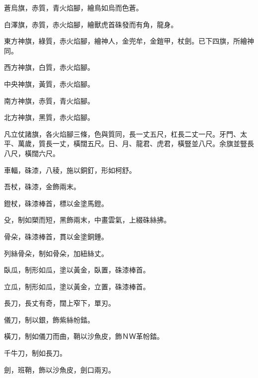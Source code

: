 \begin{pinyinscope}
 蒼烏旗，赤質，青火焰腳，繪鳥如烏而色蒼。



 白澤旗，赤質，赤火焰腳，繪獸虎首硃發而有角，龍身。



 東方神旗，綠質，赤火焰腳，繪神人，金兜牟，金鎧甲，杖劍。已下四旗，所繪神同。



 西方神旗，白質，赤火焰腳。



 中央神旗，黃質，赤火焰腳。



 南方神旗，赤質，青火焰腳。



 北方神旗，黑質，赤火焰腳。



 凡立仗諸旗，各火焰腳三條，色與質同，長一丈五尺，杠長二丈一尺。牙門、太平、萬歲，質長一丈，橫闊五尺。日、月、龍君、虎君，橫豎並八尺。余旗並豎長八尺，橫闊六尺。



 車輻，硃漆，八稜，施以銅釘，形如柯舒。



 吾杖，硃漆，金飾兩末。



 鐙杖，硃漆棒首，標以金塗馬鐙。



 殳，制如槊而短，黑飾兩末，中畫雲氣，上綴硃絲拂。



 骨朵，硃漆棒首，貫以金塗銅錘。



 列絲骨朵，制如骨朵，加紐絲丈。



 臥瓜，制形如瓜，塗以黃金，臥置，硃漆棒首。



 立瓜，制形如瓜，塗以黃金，立置，硃漆棒首。



 長刀，長丈有奇，闊上窄下，單刃。



 儀刀，制以銀，飾紫絲帉錔。



 橫刀，制如儀刀而曲，鞘以沙魚皮，飾ＮＷ革帉錔。



 千牛刀，制如長刀。



 劍，班鞘，飾以沙魚皮，劍口兩刃。




\end{pinyinscope}
